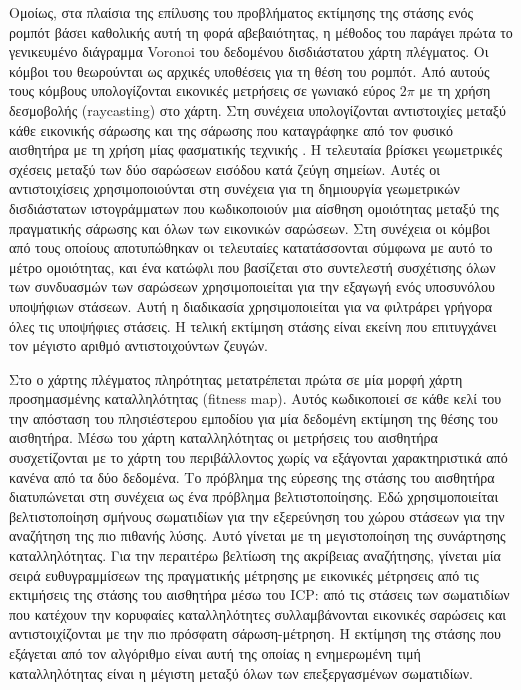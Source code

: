 Ομοίως, στα πλαίσια της επίλυσης του προβλήματος εκτίμησης της στάσης ενός
ρομπότ βάσει καθολικής αυτή τη φορά αβεβαιότητας, η μέθοδος του
\cite{Park2014a} παράγει πρώτα το γενικευμένο διάγραμμα Voronoi του δεδομένου
δισδιάστατου χάρτη πλέγματος. Οι κόμβοι του θεωρούνται ως αρχικές υποθέσεις για
τη θέση του ρομπότ. Από αυτούς τους κόμβους υπολογίζονται εικονικές μετρήσεις
σε γωνιακό εύρος $2\pi$ με τη χρήση δεσμοβολής (raycasting) στο χάρτη. Στη
συνέχεια υπολογίζονται αντιστοιχίες μεταξύ κάθε εικονικής σάρωσης και της
σάρωσης που καταγράφηκε από τον φυσικό αισθητήρα με τη χρήση μίας φασματικής
τεχνικής \cite{Leordeanu2005a}. Η τελευταία βρίσκει γεωμετρικές σχέσεις μεταξύ
των δύο σαρώσεων εισόδου κατά ζεύγη σημείων. Αυτές οι αντιστοιχίσεις
χρησιμοποιούνται στη συνέχεια για τη δημιουργία γεωμετρικών δισδιάστατων
ιστογράμματων που κωδικοποιούν μια αίσθηση ομοιότητας μεταξύ της πραγματικής
σάρωσης και όλων των εικονικών σαρώσεων. Στη συνέχεια οι κόμβοι από τους
οποίους αποτυπώθηκαν οι τελευταίες κατατάσσονται σύμφωνα με αυτό το μέτρο
ομοιότητας, και ένα κατώφλι που βασίζεται στο συντελεστή συσχέτισης όλων των
συνδυασμών των σαρώσεων χρησιμοποιείται για την εξαγωγή ενός υποσυνόλου
υποψήφιων στάσεων. Αυτή η διαδικασία χρησιμοποιείται για να φιλτράρει γρήγορα
όλες τις υποψήφιες στάσεις. Η τελική εκτίμηση στάσης είναι εκείνη που
επιτυγχάνει τον μέγιστο αριθμό αντιστοιχούντων ζευγών.

Στο \cite{Zhang2017a} ο χάρτης πλέγματος πληρότητας μετατρέπεται πρώτα σε μία
μορφή χάρτη προσημασμένης καταλληλότητας (fitness map). Αυτός κωδικοποιεί σε
κάθε κελί του την απόσταση του πλησιέστερου εμποδίου για μία δεδομένη εκτίμηση
της θέσης του αισθητήρα. Μέσω του χάρτη καταλληλότητας οι μετρήσεις του
αισθητήρα συσχετίζονται με το χάρτη του περιβάλλοντος χωρίς να εξάγονται
χαρακτηριστικά από κανένα από τα δύο δεδομένα. Το πρόβλημα της εύρεσης της
στάσης του αισθητήρα διατυπώνεται στη συνέχεια ως ένα πρόβλημα βελτιστοποίησης.
Εδώ χρησιμοποιείται βελτιστοποίηση σμήνους σωματιδίων για την εξερεύνηση του
χώρου στάσεων για την αναζήτηση της πιο πιθανής λύσης. Αυτό γίνεται με τη
μεγιστοποίηση της συνάρτησης καταλληλότητας. Για την περαιτέρω βελτίωση της
ακρίβειας αναζήτησης, γίνεται μία σειρά ευθυγραμμίσεων της πραγματικής μέτρησης
με εικονικές μέτρησεις από τις εκτιμήσεις της στάσης του αισθητήρα μέσω του
ICP: από τις στάσεις των σωματιδίων που κατέχουν την κορυφαίες καταλληλότητες
συλλαμβάνονται εικονικές σαρώσεις και αντιστοιχίζονται με την πιο πρόσφατη
σάρωση-μέτρηση. Η εκτίμηση της στάσης που εξάγεται από τον αλγόριθμο είναι
αυτή της οποίας η ενημερωμένη τιμή καταλληλότητας είναι η μέγιστη μεταξύ όλων
των επεξεργασμένων σωματιδίων.

